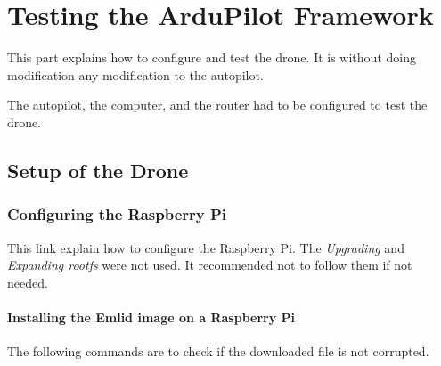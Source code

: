 \chapter{Testing the ArduPilot Framework}

This part explains how to configure and test the drone.
It is without doing modification any modification to the autopilot.

The autopilot, the computer, and the router had to be configured to test the drone.

\section{Setup of the Drone}
\subsection{Configuring the Raspberry Pi}
This link \cite{emlid_rpi_config} explain how to configure the Raspberry Pi. The \textit{Upgrading} and \textit{Expanding rootfs} were not used. It recommended not to follow them if not needed.

\subsubsection{Installing the Emlid image on a Raspberry Pi}
The following commands are to check if the downloaded file is not corrupted.

